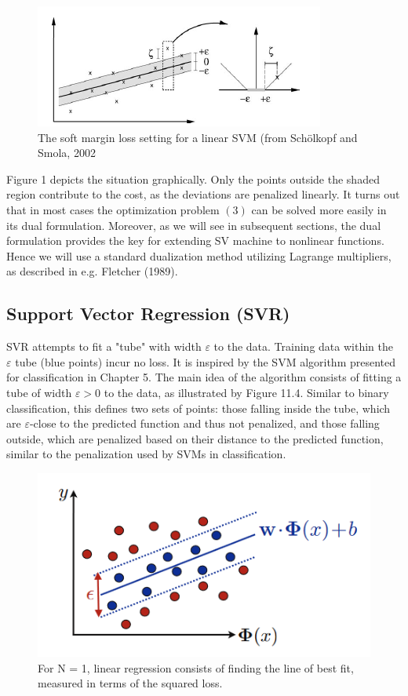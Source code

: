 \documentclass[fleqn,10pt]{olplainarticle}
\begin{document}
\begin{figure}
    \centering
    \includegraphics[width=0.8\linewidth]{Figure 1.png}
    \caption{The soft margin loss setting for a linear SVM (from Schölkopf and Smola, 2002}
    \label{fig:your_label}
\end{figure}

Figure 1 depicts the situation graphically. Only the points outside the shaded region contribute to the cost, as the deviations are penalized linearly. It turns out that in most cases the optimization problem $(3)$ can be solved more easily in its dual formulation. Moreover, as we will see in subsequent sections, the dual formulation provides the key for extending SV machine to nonlinear functions. Hence we will use a standard dualization method utilizing Lagrange multipliers, as described in e.g. Fletcher (1989).

\subsection{Support Vector Regression (SVR)}

SVR attempts to fit a "tube" with width $\varepsilon$ to the data. Training data within the $\varepsilon$ tube (blue points) incur no loss. It is inspired by the SVM algorithm presented for classification in Chapter 5. The main idea of the algorithm consists of fitting a tube of width $\varepsilon > 0$ to the data, as illustrated by Figure 11.4. Similar to binary classification, this defines two sets of points: those falling inside the tube, which are $\varepsilon$-close to the predicted function and thus not penalized, and those falling outside, which are penalized based on their distance to the predicted function, similar to the penalization used by SVMs in classification.

\begin{figure}
    \centering
    \includegraphics[width=0.8\linewidth]{SVR regression coloured.png}
    \caption{For N = 1, linear regression consists of finding the line of best fit, measured in terms of the squared loss.}
    \label{fig:your_label}
\end{figure}
\end{document}

